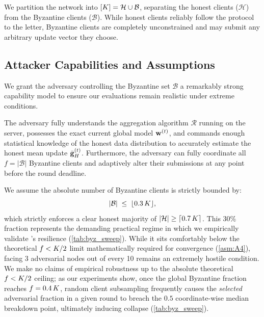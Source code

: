 \documentclass[../main]{subfiles}
\begin{document}
We partition the network into $[K] = \mathcal{H} \cup \mathcal{B}$, separating the honest clients ($\mathcal{H}$) from the Byzantine clients ($\mathcal{B}$). While honest clients reliably follow the protocol to the letter, Byzantine clients are completely unconstrained and may submit any arbitrary update vector they choose.

\subsection{Attacker Capabilities and Assumptions}
\label{sec:attacker_model}

We grant the adversary controlling the Byzantine set $\mathcal{B}$ a remarkably strong capability model to ensure our evaluations remain realistic under extreme conditions.

\begin{assumption}
\label{asm:adversary}
The adversary fully understands the aggregation algorithm $\mathcal{R}$ running on the server, possesses the exact current global model $\mathbf{w}^{(t)}$, and commands enough statistical knowledge of the honest data distribution to accurately estimate the honest mean update $\bar{\mathbf{g}}_{H}^{(t)}$. Furthermore, the adversary can fully coordinate all $f = |\mathcal{B}|$ Byzantine clients and adaptively alter their submissions at any point before the round deadline.
\end{assumption}

\begin{assumption}
\label{asm:byz_fraction}
We assume the absolute number of Byzantine clients is strictly bounded by:
\begin{equation}
    |\mathcal{B}| \;\leq\; \lfloor 0.3\, K \rfloor,
    \label{eq:byz_bound}
\end{equation}
which strictly enforces a clear honest majority of $|\mathcal{H}| \geq \lceil 0.7\, K \rceil$. This 30\% fraction represents the demanding practical regime in which we empirically validate \aegis{}'s resilience (\cref{tab:byz_sweep}). While it sits comfortably below the theoretical $f < K/2$ limit mathematically required for convergence (\cref{asm:A4}), facing 3 adversarial nodes out of every 10 remains an extremely hostile condition. We make no claims of empirical robustness up to the absolute theoretical $f < K/2$ ceiling; as our experiments show, once the global Byzantine fraction reaches $f = 0.4\,K$, random client subsampling frequently causes the \emph{selected} adversarial fraction in a given round to breach the $0.5$ coordinate-wise median breakdown point, ultimately inducing collapse (\cref{tab:byz_sweep}).
\end{assumption}
\end{document}

